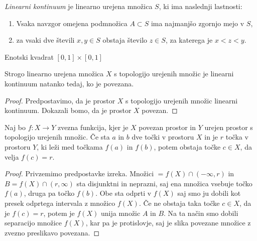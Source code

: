\documentclass[mat2]{fmfdelo}
\begin{document}
\begin{definicija}
\emph{Linearni kontinuum} je linearno urejena množica $S$, ki ima naslednji lastnosti:
\begin{enumerate}
\item Vsaka navzgor omejena podmnožica $A \subset S$ ima najmanjšo zgornjo mejo v $S$,
\item za vsaki dve števili $x, y \in S$ obstaja število $z \in S$, za katerega je $x<z<y$.
\end{enumerate}
\end{definicija}

\begin{primer}
Enotski kvadrat $[0, 1] \times [0, 1]$ 
\end{primer}

\begin{trditev}
Strogo linearno urejena množica $X$ s topologijo urejenih množic je linearni kontinuum natanko tedaj, ko je povezana.
\end{trditev}
\begin{proof}
Predpostavimo, da je prostor $X$ s topologijo urejenih množic linearni kontinuum. Dokazali bomo, da je prostor $X$ povezan.  
\end{proof}

\begin{izrek}
Naj bo $f : X \to Y$ zvezna funkcija, kjer je $X$ povezan prostor in $Y$ urejen prostor s topologijo urejenih množic. Če sta $a$ in $b$ dve točki v prostoru $X$ in je $r$ točka v prostoru $Y$, ki leži med točkama $f(a)$ in $f(b)$, potem obstaja točke $c \in X$, da velja $f(c) = r$.
\end{izrek}
\begin{proof}
Privzemimo predpostavke izreka. Množici $=f(X) \cap (-\infty, r)$ in $B=f(X) \cap (r, \infty)$ sta disjunktni in neprazni, saj ena množica vsebuje točko $f(a)$, druga pa točko $f(b)$. Obe sta odprti v $f(X)$ saj smo ju dobili kot presek odprtega intervala z množico $f(X)$. Če ne obstaja taka točke $c \in X$, da je $f(c) = r$, potem je $f(X)$ unija množic $A$ in $B$. Na ta način smo dobili separacijo množice $f(X)$, kar pa je protislovje, saj je slika povezane množice z zvezno preslikavo povezana.
\end{proof}
\end{document}
